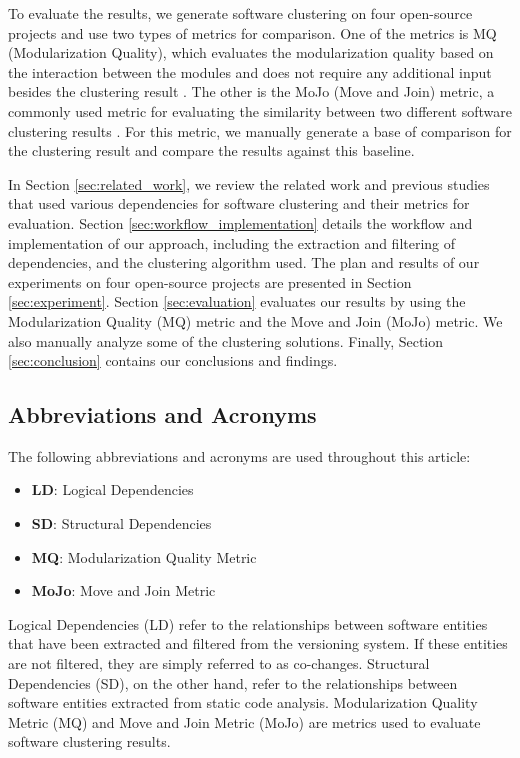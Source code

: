 \documentclass{ieeeaccess}
\begin{document}
To evaluate the results, we generate software clustering on four open-source projects and use two types of metrics for comparison. One of the metrics is MQ (Modularization Quality), which evaluates the modularization quality based on the interaction between the modules and does not require any additional input besides the clustering result \cite{b2}. The other is the MoJo (Move and Join) metric, a commonly used metric for evaluating the similarity between two different software clustering results \cite{b3}. For this metric, we manually generate a base of comparison for the clustering result and compare the results against this baseline.

In Section \ref{sec:related_work}, we review the related work and previous studies that used various dependencies for software clustering and their metrics for evaluation.
Section \ref{sec:workflow_implementation} details the workflow and implementation of our approach, including the extraction and filtering of dependencies, and the clustering algorithm used.
The plan and results of our experiments on four open-source projects are presented in Section \ref{sec:experiment}. Section \ref{sec:evaluation} evaluates our results by using the Modularization Quality (MQ) metric and the Move and Join (MoJo) metric. We also manually analyze some of the clustering solutions.
Finally, Section \ref{sec:conclusion} contains our conclusions and findings.

\subsection{Abbreviations and Acronyms}

The following abbreviations and acronyms are used throughout this article:

\begin{itemize}
    \item \textbf{LD}: Logical Dependencies
    \item \textbf{SD}: Structural Dependencies
    \item \textbf{MQ}: Modularization Quality Metric
    \item \textbf{MoJo}: Move and Join Metric
\end{itemize}


Logical Dependencies (LD) refer to the relationships between software entities that have been extracted and filtered from the versioning system. If these entities are not filtered, they are simply referred to as co-changes. 
Structural Dependencies (SD), on the other hand, refer to the relationships between software entities extracted from static code analysis.
Modularization Quality Metric (MQ) and Move and Join Metric (MoJo) are metrics used to evaluate software clustering results.
\end{document}
